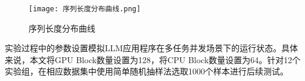 \begin{figure}[!ht]
  \centering
  \texttt{[image: 序列长度分布曲线.png]}
  \caption{序列长度分布曲线}
  \label{Fig:序列长度分布曲线}
\end{figure}

实验过程中的参数设置模拟LLM应用程序在多任务并发场景下的运行状态。具体来说，本文将GPU Block数量设置为128，将CPU Block数量设置为64。针对12个实验组，在相应数据集中使用简单随机抽样法选取1000个样本进行后续测试。







\subsection{\color{red}{吞吐率测试}}


